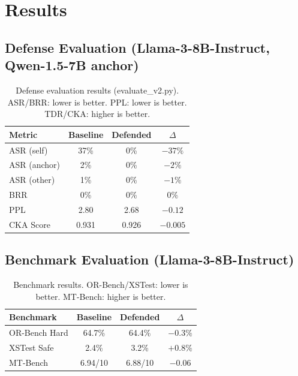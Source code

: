 \documentclass[11pt]{article}
\begin{document}
\section{Results}

\subsection{Defense Evaluation (Llama-3-8B-Instruct, Qwen-1.5-7B anchor)}

\begin{table}[h]
\centering
\caption{Defense evaluation results (evaluate\_v2.py). ASR/BRR: lower is better. PPL: lower is better. TDR/CKA: higher is better.}
\label{tab:defense_results}
\begin{tabular}{@{}lccc@{}}
\toprule
\textbf{Metric} & \textbf{Baseline} & \textbf{Defended} & \textbf{$\Delta$} \\
\midrule
ASR (self)    & 37\% & 0\% & $-37\%$ \\
ASR (anchor)  & 2\%  & 0\% & $-2\%$ \\
ASR (other)   & 1\%  & 0\% & $-1\%$ \\
BRR           & 0\%  & 0\% & $0\%$ \\
PPL           & 2.80 & 2.68 & $-0.12$ \\
CKA Score     & 0.931 & 0.926 & $-0.005$ \\
\bottomrule
\end{tabular}
\end{table}

\subsection{Benchmark Evaluation (Llama-3-8B-Instruct)}

\begin{table}[h]
\centering
\caption{Benchmark results. OR-Bench/XSTest: lower is better. MT-Bench: higher is better.}
\label{tab:benchmark_results}
\begin{tabular}{@{}lccc@{}}
\toprule
\textbf{Benchmark} & \textbf{Baseline} & \textbf{Defended} & \textbf{$\Delta$} \\
\midrule
OR-Bench Hard  & 64.7\% & 64.4\% & $-0.3\%$ \\
XSTest Safe    & 2.4\%  & 3.2\%  & $+0.8\%$ \\
MT-Bench       & 6.94/10 & 6.88/10 & $-0.06$ \\
\bottomrule
\end{tabular}
\end{table}
\end{document}
